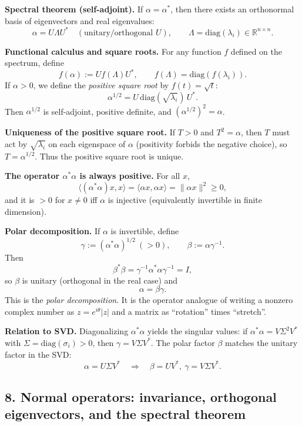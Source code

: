 \documentclass[12pt,a4paper]{article}
\theoremstyle{plain}
\theoremstyle{definition}      %
\begin{document}
\textbf{Spectral theorem (self-adjoint).}
If $\alpha=\alpha^*$, then there exists an orthonormal basis of eigenvectors and real eigenvalues:
\[
\alpha = U\Lambda U^*\quad (\text{unitary/orthogonal }U),\qquad \Lambda=\mathrm{diag}(\lambda_i)\in \mathbb R^{n\times n}.
\]

\textbf{Functional calculus and square roots.}
For any function $f$ defined on the spectrum, define
\[
f(\alpha):=U f(\Lambda) U^*,\qquad f(\Lambda)=\mathrm{diag}(f(\lambda_i)).
\]
If $\alpha>0$, we define the \emph{positive square root} by $f(t)=\sqrt t$:
\[
\alpha^{1/2}=U\,\mathrm{diag}(\sqrt{\lambda_i})\,U^*.
\]
Then $\alpha^{1/2}$ is self-adjoint, positive definite, and $(\alpha^{1/2})^2=\alpha$.

\textbf{Uniqueness of the positive square root.}
If $T>0$ and $T^2=\alpha$, then $T$ must act by $\sqrt{\lambda_i}$ on each eigenspace of $\alpha$ (positivity forbids the negative choice),
so $T=\alpha^{1/2}$. Thus the positive square root is unique.

\textbf{The operator $\alpha^*\alpha$ is always positive.}
For all $x$,
\[
\langle (\alpha^*\alpha)x,x\rangle=\langle \alpha x,\alpha x\rangle=\|\alpha x\|^2\ge 0,
\]
and it is $>0$ for $x\neq 0$ iff $\alpha$ is injective (equivalently invertible in finite dimension).

\textbf{Polar decomposition.}
If $\alpha$ is invertible, define
\[
\gamma:=(\alpha^*\alpha)^{1/2}\ (>0),\qquad \beta:=\alpha\gamma^{-1}.
\]
Then
\[
\beta^*\beta=\gamma^{-1}\alpha^*\alpha\gamma^{-1}=I,
\]
so $\beta$ is unitary (orthogonal in the real case) and
\[
\alpha=\beta\gamma.
\]
This is the \emph{polar decomposition}. It is the operator analogue of writing a nonzero complex number as
$z=e^{i\theta}|z|$ and a matrix as ``rotation'' times ``stretch''.

\textbf{Relation to SVD.}
Diagonalizing $\alpha^*\alpha$ yields the singular values:
if $\alpha^*\alpha = V\Sigma^2 V^*$ with $\Sigma=\mathrm{diag}(\sigma_i)>0$, then $\gamma=V\Sigma V^*$.
The polar factor $\beta$ matches the unitary factor in the SVD:
\[
\alpha=U\Sigma V^* \quad \Rightarrow\quad \beta=UV^*,\ \gamma=V\Sigma V^*.
\]


\subsection*{8. Normal operators: invariance, orthogonal eigenvectors, and the spectral theorem}
\end{document}
